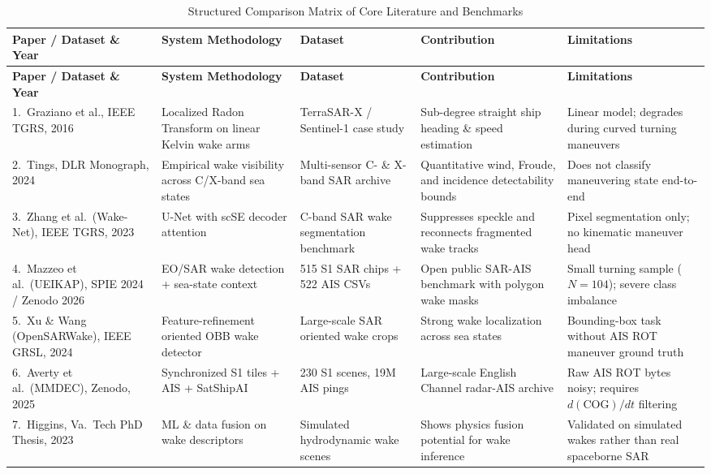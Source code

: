 \documentclass[11pt,a4paper]{article}
\begin{document}
{\small
\begin{longtable}{|p{2.5cm}|p{2.7cm}|p{2.1cm}|p{2.9cm}|p{2.7cm}|}
\caption{Structured Comparison Matrix of Core Literature and Benchmarks}
\label{tab:lit_summary} \\
\hline
\rowcolor{ruetgray}
\textbf{Paper / Dataset \& Year} & \textbf{System Methodology} & \textbf{Dataset} & \textbf{Contribution} & \textbf{Limitations} \\ \hline
\endfirsthead
\hline
\rowcolor{ruetgray}
\textbf{Paper / Dataset \& Year} & \textbf{System Methodology} & \textbf{Dataset} & \textbf{Contribution} & \textbf{Limitations} \\ \hline
\endhead
1.\ Graziano et al., IEEE TGRS, 2016~\cite{graziano2016ship} & Localized Radon Transform on linear Kelvin wake arms & TerraSAR-X / Sentinel-1 case study & Sub-degree straight ship heading \& speed estimation & Linear model; degrades during curved turning maneuvers \\ \hline
2.\ Tings, DLR Monograph, 2024~\cite{tings2024erkennung} & Empirical wake visibility across C/X-band sea states & Multi-sensor C- \& X-band SAR archive & Quantitative wind, Froude, and incidence detectability bounds & Does not classify maneuvering state end-to-end \\ \hline
3.\ Zhang et al.\ (Wake-Net), IEEE TGRS, 2023~\cite{zhang2023wakenet} & U-Net with scSE decoder attention & C-band SAR wake segmentation benchmark & Suppresses speckle and reconnects fragmented wake tracks & Pixel segmentation only; no kinematic maneuver head \\ \hline
4.\ Mazzeo et al.\ (UEIKAP), SPIE 2024 / Zenodo 2026~\cite{mazzeo2024spie_ueikap,mazzeo2026ueikap} & EO/SAR wake detection + sea-state context & 515 S1 SAR chips + 522 AIS CSVs & Open public SAR-AIS benchmark with polygon wake masks & Small turning sample ($N=104$); severe class imbalance \\ \hline
5.\ Xu \& Wang (OpenSARWake), IEEE GRSL, 2024~\cite{xu2024opensarwake} & Feature-refinement oriented OBB wake detector & Large-scale SAR oriented wake crops & Strong wake localization across sea states & Bounding-box task without AIS ROT maneuver ground truth \\ \hline
6.\ Averty et al.\ (MMDEC), Zenodo, 2025~\cite{averty_mmdec} & Synchronized S1 tiles + AIS + SatShipAI & 230 S1 scenes, 19M AIS pings & Large-scale English Channel radar-AIS archive & Raw AIS ROT bytes noisy; requires $d(\text{COG})/dt$ filtering \\ \hline
7.\ Higgins, Va.\ Tech PhD Thesis, 2023~\cite{higgins2023machine} & ML \& data fusion on wake descriptors & Simulated hydrodynamic wake scenes & Shows physics fusion potential for wake inference & Validated on simulated wakes rather than real spaceborne SAR \\ \hline

\end{longtable}}
\end{document}
